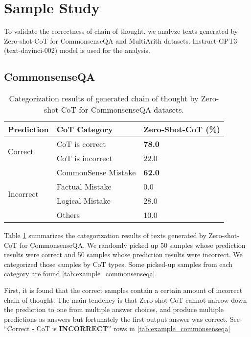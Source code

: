 \documentclass{article}
\newcommand{\CoT}{chain of thought\xspace}
\newcommand{\ours}{Zero-shot-CoT\xspace}
\begin{document}
\section{Sample Study}
\label{appx:error_analysis}

To validate the correctness of \CoT, we analyze texts generated by \ours for CommonsenseQA and MultiArith datasets. Instruct-GPT3 (text-davinci-002) model is used for the analysis.

\subsection{CommonsenseQA}

\begin{table}[h]
\centering
\captionsetup{width=0.65\textwidth}
\caption{Categorization results of generated \CoT by \ours for CommonsenseQA datasets.}
\label{tab:analysis_commonsenseqa}
\begin{tabular}{lll}\toprule
Prediction &CoT Category &Zero-Shot-CoT (\%) \\\midrule \midrule
\multirow{2}{*}{Correct} &CoT is correct &\textbf{78.0} \\
&CoT is incorrect &22.0 \\

\midrule

\multirow{4}{*}{Incorrect} &CommonSense Mistake &\textbf{62.0} \\
&Factual Mistake &0.0 \\
&Logical Mistake &28.0 \\
&Others &10.0 \\
\bottomrule
\end{tabular}
\end{table} 
Table \ref{tab:analysis_commonsenseqa} summarizes the categorization results of texts generated by \ours for CommonsenseQA. We randomly picked up 50 samples whose prediction results were correct and 50 samples whose prediction results were incorrect. We categorized those samples by CoT types. Some picked-up samples from each category are found \autoref{tab:example_commonsenseqa}. 

First, it is found that the correct samples contain a certain amount of incorrect \CoT. The main tendency is that \ours cannot narrow down the prediction to one from multiple answer choices, and produce multiple predictions as answers but fortunately the first output answer was correct. See ``Correct - CoT is \textbf{INCORRECT}'' rows in \autoref{tab:example_commonsenseqa}
\end{document}
